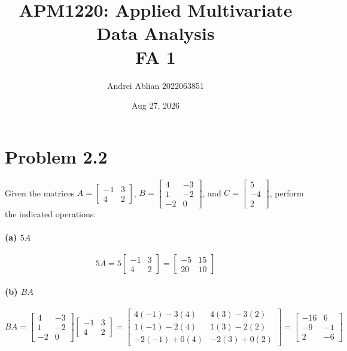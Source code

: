 \documentclass[12pt]{article}
\title{APM1220: Applied Multivariate Data Analysis \\ FA 1}
\author{Andrei Ablian 2022063851}
\date{Aug 27, 2026}
\begin{document}
\maketitle

\section*{Problem 2.2} 
Given the matrices 
$A = \begin{bmatrix} -1 & 3 \\ 4 & 2 \end{bmatrix}$, 
$B = \begin{bmatrix} 4 & -3 \\ 1 & -2 \\ -2 & 0 \end{bmatrix}$, and 
$C = \begin{bmatrix} 5 \\ -4 \\ 2 \end{bmatrix}$, perform the indicated operations: 

\paragraph{(a) $5A$} 
\[
5A = 5 \begin{bmatrix} -1 & 3 \\ 4 & 2 \end{bmatrix} = \begin{bmatrix} -5 & 15 \\ 20 & 10 \end{bmatrix}
\] 

\paragraph{(b) $BA$} 
\[
BA = \begin{bmatrix} 4 & -3 \\ 1 & -2 \\ -2 & 0 \end{bmatrix} \begin{bmatrix} -1 & 3 \\ 4 & 2 \end{bmatrix} = \begin{bmatrix} 4(-1) - 3(4) & 4(3) - 3(2) \\ 1(-1) - 2(4) & 1(3) - 2(2) \\ -2(-1) + 0(4) & -2(3) + 0(2) \end{bmatrix} = \begin{bmatrix} -16 & 6 \\ -9 & -1 \\ 2 & -6 \end{bmatrix}
\] 
\end{document}
